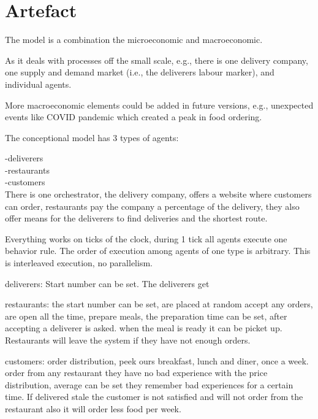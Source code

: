 \section{Artefact}\label{sec:artefact}

The model is a combination the microeconomic and macroeconomic.

As it deals with processes off the small scale, e.g., there is one delivery company, one supply and demand market (i.e., the deliverers labour marker), and
individual agents.



More macroeconomic elements could be added in future versions, e.g., unexpected events like COVID pandemic which created a peak in food ordering.


The conceptional model has 3 types of agents:

-deliverers \\
-restaurants \\
-customers \\

There is one orchestrator, the delivery company, offers a website where customers can order,
restaurants pay the company a percentage of the delivery, they also offer means for the deliverers to
find deliveries and the shortest route.

Everything works on ticks of the clock, during 1 tick all agents execute one behavior rule.
The order of execution among agents of one type is arbitrary.
This is interleaved execution, no parallelism.


deliverers:
Start number can be set.
The deliverers get


restaurants:
the start number can be set, are placed at random
accept any orders, are open all the time,
prepare meals, the preparation time can be set,
after accepting a deliverer is asked.
when the meal is ready it can be picket up.
Restaurants will leave the system if they have not enough orders.

customers:
order distribution, peek ours breakfast, lunch and  diner, once a week.
order from any restaurant they have no bad experience with
the price distribution, average can be set
they remember bad experiences for a certain time.
If delivered stale the customer is not satisfied and will not order from the restaurant also
it will order less food per week.

